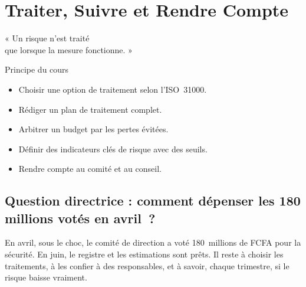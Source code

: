 
\chapter{Traiter, Suivre et Rendre Compte}
\label{chap:traiter}

\epigraph{%
    « Un risque n'est traité\\
    que lorsque la mesure fonctionne. »%
}{Principe du cours}


\begin{boxobjectifs}
\begin{itemize}
    \item Choisir une option de traitement selon l'ISO~31000.
    \item Rédiger un plan de traitement complet.
    \item Arbitrer un budget par les pertes évitées.
    \item Définir des indicateurs clés de risque avec des seuils.
    \item Rendre compte au comité et au conseil.
\end{itemize}
\end{boxobjectifs}

\bigskip

\section*{Question directrice : comment dépenser les 180 millions votés en avril~?}

En avril, sous le choc, le comité de direction a voté 180~millions de
FCFA pour la sécurité. En juin, le registre et les estimations sont
prêts. Il reste à choisir les traitements, à les confier à des
responsables, et à savoir, chaque trimestre, si le risque baisse
vraiment.

